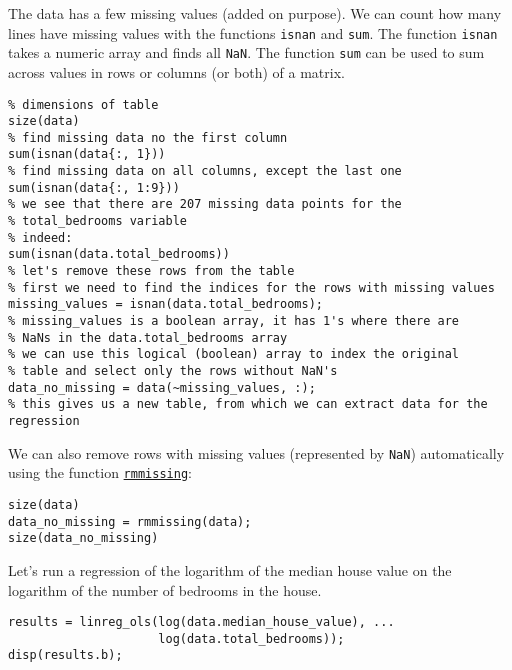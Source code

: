 \documentclass[12pt, a4paper]{article}
\begin{document}
The data has a few missing values (added on purpose).
We can count how many lines have missing values with the functions \texttt{isnan} and \texttt{sum}.
The function \texttt{isnan} takes a numeric array and finds all \texttt{NaN}.
The function \texttt{sum} can be used to sum across values in rows or columns (or both) of a matrix.
\lstset{language=matlab,label= ,caption= ,captionpos=b,firstnumber=1,numbers=left,style=Matlab-editor}
\begin{lstlisting}
% dimensions of table
size(data)
% find missing data no the first column
sum(isnan(data{:, 1}))
% find missing data on all columns, except the last one
sum(isnan(data{:, 1:9}))
% we see that there are 207 missing data points for the
% total_bedrooms variable
% indeed:
sum(isnan(data.total_bedrooms))
% let's remove these rows from the table
% first we need to find the indices for the rows with missing values
missing_values = isnan(data.total_bedrooms);
% missing_values is a boolean array, it has 1's where there are
% NaNs in the data.total_bedrooms array
% we can use this logical (boolean) array to index the original
% table and select only the rows without NaN's
data_no_missing = data(~missing_values, :);
% this gives us a new table, from which we can extract data for the regression
\end{lstlisting}

We can also remove rows with missing values (represented by \texttt{NaN}) automatically using the function \href{https://www.mathworks.com/help/matlab/ref/rmmissing.html}{\texttt{rmmissing}}:
\lstset{language=matlab,label= ,caption= ,captionpos=b,firstnumber=1,numbers=left,style=Matlab-editor}
\begin{lstlisting}
size(data)
data_no_missing = rmmissing(data);
size(data_no_missing)
\end{lstlisting}

Let's run a regression of the logarithm of the median house value on the logarithm of the number of bedrooms in the house.
\lstset{language=matlab,label= ,caption= ,captionpos=b,firstnumber=1,numbers=left,style=Matlab-editor}
\begin{lstlisting}
results = linreg_ols(log(data.median_house_value), ...
                     log(data.total_bedrooms));
disp(results.b);
\end{lstlisting}
\end{document}

